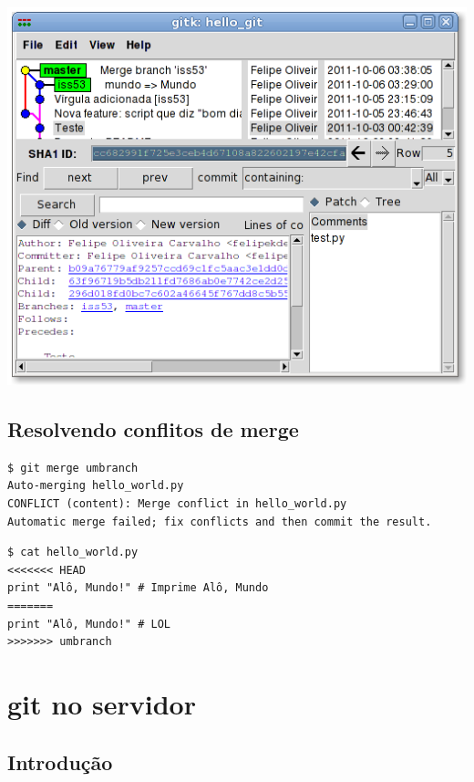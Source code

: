 \documentclass[portuguese,brazil]{beamer}
\newcommand\sectiontoc{
  \begin{frame}
    \tableofcontents[currentsection]
  \end{frame}
}
\begin{document}
\begin{frame}
\begin{center}
  \includegraphics[scale=.38]{images/gitkmergeiss53.png}
\end{center}
\end{frame}

\subsection{Resolvendo conflitos de merge}

\begin{frame}[fragile]
\begin{verbatim}
$ git merge umbranch
Auto-merging hello_world.py
CONFLICT (content): Merge conflict in hello_world.py
Automatic merge failed; fix conflicts and then commit the result.
\end{verbatim}
\pause
\begin{verbatim}
$ cat hello_world.py
<<<<<<< HEAD
print "Alô, Mundo!" # Imprime Alô, Mundo
=======
print "Alô, Mundo!" # LOL
>>>>>>> umbranch
\end{verbatim}
\end{frame}

\section{git no servidor}

\sectiontoc

\subsection{Introdução}
\end{document}
